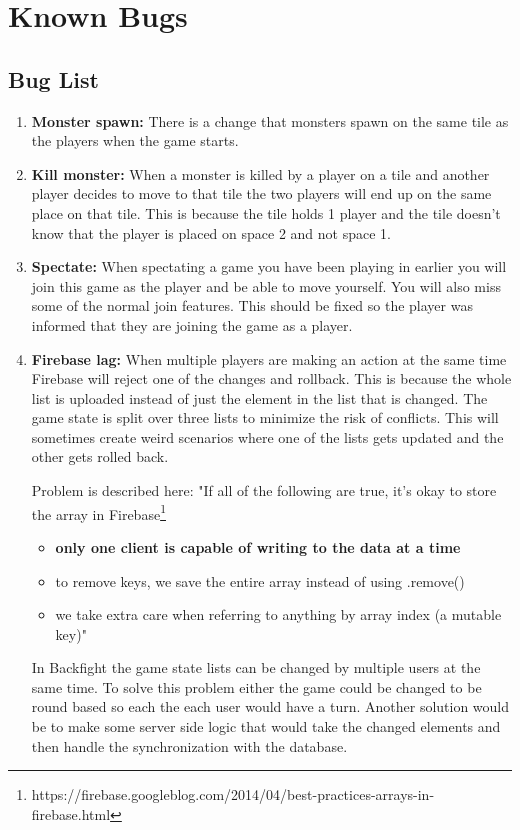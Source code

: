 \pagestyle{Uni}

\chapter{Known Bugs}

\section{Bug List}

\begin{enumerate}
	\item \textbf{Monster spawn:} There is a change that monsters spawn on the same tile as the players when the game starts.
	
	\item \textbf{Kill monster:} When a monster is killed by a player on a tile and another player decides to move to that tile the two players will end up on the same place on that tile. This is because the tile holds 1 player and the tile doesn't know that the player is placed on space 2 and not space 1.
		
	\item \textbf{Spectate:} When spectating a game you have been playing in earlier you will join this game as the player and be able to move yourself. You will also miss some of the normal join features. This should be fixed so the player was informed that they are joining the game as a player.

	\item \textbf{Firebase lag:} When multiple players are making an action at the same time Firebase will reject one of the changes and rollback. This is because the whole list is uploaded instead of just the element in the list that is changed. The game state is split over three lists to minimize the risk of conflicts. This will sometimes create weird scenarios where one of the lists gets updated and the other gets rolled back.
	
	Problem is described here: "If all of the following are true, it's okay to store the array in Firebase\footnote{https://firebase.googleblog.com/2014/04/best-practices-arrays-in-firebase.html}
	
	\begin{itemize}
		\item \textbf{only one client is capable of writing to the data at a time}
		\item to remove keys, we save the entire array instead of using .remove()
		\item we take extra care when referring to anything by array index (a mutable key)"
	\end{itemize}
	In Backfight the game state lists can be changed by multiple users at the same time. To solve this problem either the game could be changed to be round based so each the each user would have a turn. Another solution would be to make some server side logic that would take the changed elements and then handle the synchronization with the database.
	

\end{enumerate}
